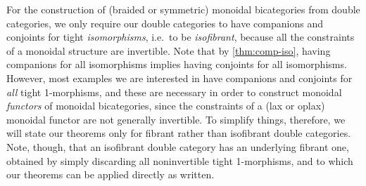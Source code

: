 \begin{rmk}
  For the construction of (braided or symmetric) monoidal bicategories from double categories, we only require our double
  categories to have companions and conjoints for tight
  \emph{isomorphisms}, i.e.\ to be \emph{isofibrant}, because all the constraints of a monoidal structure are invertible.
  Note that by \autoref{thm:comp-iso},
  having companions for all isomorphisms implies having conjoints for
  all isomorphisms.  However, most examples we are interested in have
  companions and conjoints for \emph{all} tight 1-morphisms, and these are necessary in order to construct monoidal \emph{functors} of monoidal bicategories, since the constraints of a (lax or oplax) monoidal functor are not generally invertible.
  To simplify things, therefore, we will state our theorems only for fibrant rather than isofibrant double categories.
  Note, though, that an isofibrant double category has an underlying fibrant one, obtained by simply discarding all noninvertible tight 1-morphisms, and to which our theorems can be applied directly as written.
\end{rmk}

